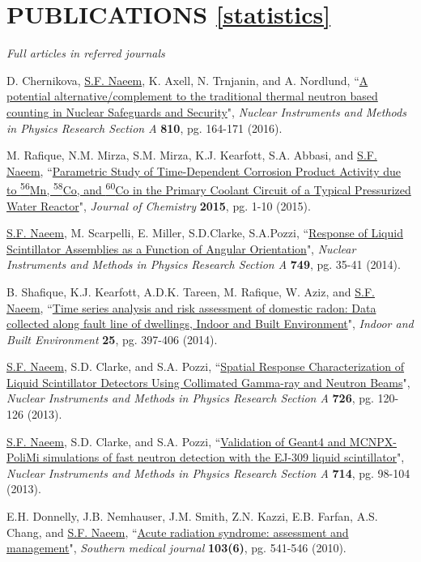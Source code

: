 \documentclass[paper=letter,fontsize=11pt]{scrartcl} %
\newcommand{\NewPart}[2]{\section*{\uppercase{#1} #2}}
\newcommand{\PaperEntry}[7]{
		\noindent #1, ``\href{#7}{#2}", \textit{#3} \textbf{#4}, #5 (#6).}
\begin{document}
\NewPart{Publications}{\href{https://scholar.google.se/citations?user=1e-aST0AAAAJ&hl=en}{[statistics]}}
\textit{{Full articles in referred journals}}
\begin{etaremune}

\item \PaperEntry{D. Chernikova, \underline{S.F. Naeem}, K. Axell, N. Trnjanin, and A. Nordlund}{A potential alternative/complement to the traditional thermal neutron based counting in Nuclear Safeguards and Security}{Nuclear Instruments and Methods in Physics Research Section A}{810}{pg. 164-171}{2016}{http://dx.doi.org/10.1016/j.nima.2015.11.146}

\item \PaperEntry{M. Rafique, N.M. Mirza, S.M. Mirza, K.J. Kearfott, S.A. Abbasi, and \underline{S.F. Naeem}}{Parametric Study of Time-Dependent Corrosion Product Activity due to \textsuperscript{56}Mn, \textsuperscript{58}Co, and \textsuperscript{60}Co in the Primary Coolant Circuit of a Typical Pressurized Water Reactor}{Journal of Chemistry}{2015}{pg. 1-10}{2015}{http://dx.doi.org/10.1155/2015/809672}

\item \PaperEntry{\underline{S.F. Naeem}, M. Scarpelli, E. Miller, S.D.Clarke, S.A.Pozzi}{Response of Liquid Scintillator Assemblies as a Function of Angular Orientation}{Nuclear Instruments and Methods in Physics Research Section A}{749}{pg. 35-41}{2014}{http://dx.doi.org/10.1016/j.nima.2014.02.050}

\item \PaperEntry{B. Shafique, K.J. Kearfott, A.D.K. Tareen, M. Rafique, W. Aziz, and \underline{S.F. Naeem}}{Time series analysis and risk assessment of domestic radon: Data collected along fault line of dwellings, Indoor and Built Environment}{Indoor and Built Environment}{25}{pg. 397-406}{2014}{http://ibe.sagepub.com/content/25/2/397}

\item \PaperEntry{\underline{S.F. Naeem}, S.D. Clarke, and S.A. Pozzi}{Spatial Response Characterization of Liquid Scintillator Detectors Using Collimated Gamma-ray and Neutron Beams}{Nuclear Instruments and Methods in Physics Research Section A}{726}{pg. 120-126}{2013}{http://dx.doi.org/10.1016/j.nima.2013.05.120}

\item \PaperEntry{\underline{S.F. Naeem}, S.D. Clarke, and S.A. Pozzi}{Validation of Geant4 and MCNPX-PoliMi simulations of fast neutron detection with the EJ-309 liquid scintillator}{Nuclear Instruments and Methods in Physics Research Section A}{714}{pg. 98-104}{2013}{http://dx.doi.org/10.1016/j.nima.2013.02.017}

\item \PaperEntry{E.H. Donnelly, J.B. Nemhauser, J.M. Smith, Z.N. Kazzi, E.B. Farfan, A.S. Chang, and \underline{S.F. Naeem}}{Acute radiation syndrome: assessment and management}{Southern medical journal}{103(6)}{pg. 541-546}{2010}{http://www.ncbi.nlm.nih.gov/pubmed/20710137}
\end{etaremune}
\end{document}
